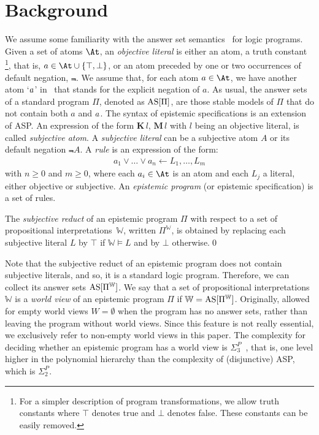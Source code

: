 \documentclass{new_tlp}
\def\K{\mathbf{K}\, }
\def\M{\mathbf{M}\, }
\let\sneg\relax
\newcommand{\sneg}{\ensuremath{\text{-}}}
\def\AS{\text{\rm AS}}
\newcommand\wv{\mathbb{W}}
\begin{document}
\section{Background}
\label{sec:background}
We assume some familiarity with the answer set semantics~\cite{GL91} for logic programs.
%
Given a set of atoms $\At$, an \emph{objective literal} is either an atom, a truth constant%
\footnote{For a simpler description of program transformations, we allow truth constants where $\top$ denotes true and $\bot$ denotes false.
  These constants can be easily removed.},
that is, \mbox{$a \in \At \cup \{\top,\bot\}$}, or an atom preceded by one or two occurrences of default negation, $\Not$.
%
We assume that, for each atom $a \in \At$, we have another atom `$\sneg a$' in \At\ that stands for the explicit negation of $a$.
%
As usual, the answer sets of a standard program $\Pi$, denoted as $\AS[\Pi]$, are those stable models of $\Pi$ that do not contain both $a$ and $\sneg a$.
%
The syntax of epistemic specifications is an extension of ASP.
%
An expression of the form $\K l$, $\M l$ with $l$ being an objective literal, is called \emph{subjective atom}.
%
A \emph{subjective literal} can be a subjective atom $A$ or its default negation $\Not A$.
%
A \emph{rule} is an expression of the form:
\begin{gather}
a_1 \vee \dots \vee a_n \leftarrow L_1, \dots, L_m
	\label{eq:rule}
\end{gather}
with $n\geq 0$ and $m\geq 0$, where each $a_i \in \At$ is an atom and each $L_j$ a literal, either objective or subjective.
%
An \emph{epistemic program} (or epistemic specification) is a set of rules.

\begin{definition}
The \emph{subjective reduct} of an epistemic program $\Pi$ with respect to a set of propositional interpretations~$\wv$, written $\Pi^\wv$, is
obtained by replacing each subjective literal $L$ by $\top$ if $\wv \models L$ and by $\bot$ otherwise.\qed
\end{definition}

Note that the subjective reduct of an epistemic program does not contain subjective literals, and so, it is a standard logic program.
%
Therefore, we can collect its answer sets $\AS[\Pi^\wv]$.
%
We say that a set of propositional interpretations $\wv$ is a \emph{world view} of an epistemic program $\Pi$ if $\wv=\AS[\Pi^\wv]$.
%
Originally, \cite{gelfond91a} allowed for empty world views $W=\emptyset$ when the program has no answer sets, rather than leaving the program without world views.
%
Since this feature is not really essential, we exclusively refer to non-empty world views in this paper.
%
The complexity for deciding whether an epistemic program has a world view is $\Sigma^{P}_{3}$~\cite{truszczynski11b}, that is,
one level higher in the polynomial hierarchy than the complexity of (disjunctive) ASP, which is $\Sigma^{P}_{2}$.
\end{document}
